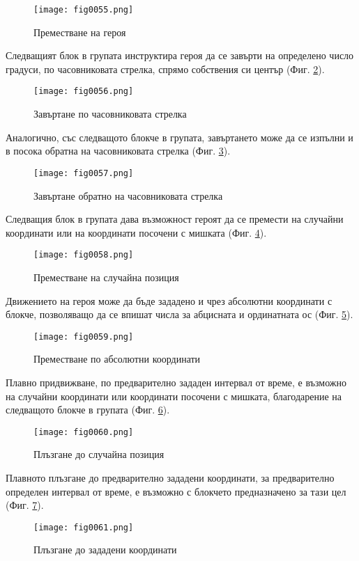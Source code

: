 \begin{figure}[H]
  \centering
  \texttt{[image: fig0055.png]}
  \caption{Преместване на героя}
\label{fig0055}
\end{figure}

Следващият блок в групата инструктира героя да се завърти на определено число градуси, по часовниковата стрелка, спрямо собствения си център (Фиг. \ref{fig0056}).

\begin{figure}[H]
  \centering
  \texttt{[image: fig0056.png]}
  \caption{Завъртане по часовниковата стрелка}
\label{fig0056}
\end{figure}

Аналогично, със следващото блокче в групата, завъртането може да се изпълни и в посока обратна на часовниковата стрелка (Фиг. \ref{fig0057}).

\begin{figure}[H]
  \centering
  \texttt{[image: fig0057.png]}
  \caption{Завъртане обратно на часовниковата стрелка}
\label{fig0057}
\end{figure}

Следващия блок в групата дава възможност героят да се премести на случайни координати или на координати посочени с мишката (Фиг. \ref{fig0058}).

\begin{figure}[H]
  \centering
  \texttt{[image: fig0058.png]}
  \caption{Преместване на случайна позиция}
\label{fig0058}
\end{figure}

Движението на героя може да бъде зададено и чрез абсолютни координати с блокче, позволяващо да се впишат числа за абцисната и ординатната ос (Фиг. \ref{fig0059}).

\begin{figure}[H]
  \centering
  \texttt{[image: fig0059.png]}
  \caption{Преместване по абсолютни координати}
\label{fig0059}
\end{figure}

Плавно придвижване, по предварително зададен интервал от време, е възможно на случайни координати или координати посочени с мишката, благодарение на следващото блокче в групата (Фиг. \ref{fig0060}).

\begin{figure}[H]
  \centering
  \texttt{[image: fig0060.png]}
  \caption{Плъзгане до случайна позиция}
\label{fig0060}
\end{figure}

Плавното плъзгане до предварително зададени координати, за предварително определен интервал от време, е възможно с блокчето предназначено за тази цел (Фиг. \ref{fig0061}).

\begin{figure}[H]
  \centering
  \texttt{[image: fig0061.png]}
  \caption{Плъзгане до зададени координати}
\label{fig0061}
\end{figure}


